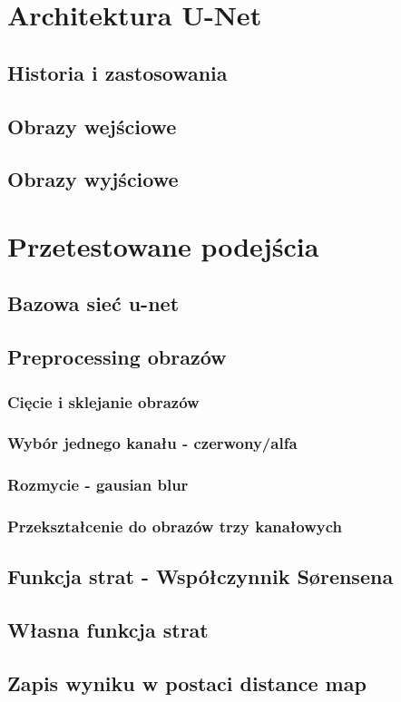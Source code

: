 \documentclass{article}
\begin{document}
\section{Architektura U-Net}
\subsection{Historia i zastosowania}
\subsection{Obrazy wejściowe}
\subsection{Obrazy wyjściowe}
\section{Przetestowane podejścia}
\subsection{Bazowa sieć u-net}
\subsection{Preprocessing obrazów}
\subsubsection{Cięcie i sklejanie obrazów}
\subsubsection{Wybór jednego kanału - czerwony/alfa}
\subsubsection{Rozmycie - gausian blur}
\subsubsection{Przekształcenie do obrazów trzy kanałowych}
\subsection{Funkcja strat - Współczynnik Sørensena}
\subsection{Własna funkcja strat}
\subsection{Zapis wyniku w postaci distance map}
\end{document}
